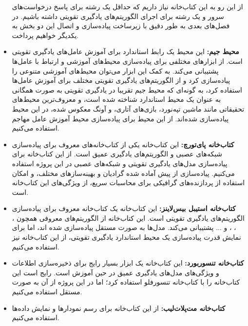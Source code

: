 \begin{itemize}
    از این رو به این کتاب‌خانه نیاز داریم که حداقل یک رشته برای پاسخ درخواست‌های سرور و یک رشته برای اجرای الگوریتم‌های یادگیری تقویتی داشته باشیم.
    در فصل‌های بعدی به طور دقیق با زیرساخت پیاده‌سازی و اتصال این دو بخش به یکدیگر خواهیم پرداخت.
    \item \textbf{محیط جیم:}
    این محیط یک رابط استاندارد برای آموزش عامل‌های یادگیری تقویتی است\cite{brockman2016openai}.
    از ابزار‌های مختلفی برای پیاده‌سازی محیط‌های آموزشی و ارتباط با عامل‌ها پشتیبانی می‌کند.
    به کمک این ابزار می‌توان محیط‌های آموزشی متنوعی را پیاده‌سازی کرد و از الگوریتم‌های یادگیری تقویتی مختلف برای آموزش عامل‌ها استفاده کرد، به گونه‌ای که محیط جیم تقریبا 
    در یادگیری تقویتی به صورت همگانی به عنوان یک محیط استاندارد شناخته شده است، و معروف‌ترین محیط‌های تحقیقاتی مانند
    ماشین تپه‌نورد\cite{Moore90efficientmemory-based}،
    بازی‌های آتاری،
    و آونگ معکوس شده،
    در این محیط پیاده‌سازی شده‌اند.
    از این محیط برای پیاده‌سازی محیط آموزش عامل مهاجم استفاده می‌کنیم.
    \item \textbf{کتاب‌خانه پای‌تورچ:}
    این کتاب‌خانه یکی از کتاب‌خانه‌های معروف برای پیاده‌سازی شبکه‌های عصبی و الگوریتم‌های یادگیری عمیق است.
    از این کتاب‌خانه برای پیاده‌سازی مدل‌های یادگیری تقویتی و شبکه‌های عصبی در این پروژه استفاده می‌کنیم.
    پیاده‌سازی از پیش آماده شده گرادیان و بهینه‌ساز‌های مختلف، و امکان استفاده از پردازنده‌های گرافیکی برای محاسبات سریع، از ویژگی‌های این کتاب‌خانه است\cite{paszke2019pytorch}.
    \item \textbf{کتاب‌خانه استیبل بیس‌لاینز:}
    این کتاب‌خانه یک کتاب‌خانه معروف برای پیاده‌سازی الگوریتم‌های یادگیری تقویتی است\cite{raffin2021stable}.
    این کتاب‌خانه از الگوریتم‌های معروفی همچون ، ، ، و ... پشتیبانی می‌کند.
    مدل‌ها به صورت مستقل پیاده‌سازی شده اند، اما برای نمایش قدرت پیاده‌سازی یک محیط استاندارد یادگیری تقویتی، از این کتاب‌خانه نیز استفاده می‌کنیم.
    \item \textbf{کتاب‌خانه تنسوربورد:}
    این کتاب‌خانه یک ابزار بسیار رایج برای ذخیره‌سازی اطلاعات و ویژگی‌های مدل‌های یادگیری عمیق در حین آموزش است.
    رایج است این کتاب‌خانه را با کتاب‌خانه تنسورفلو استفاده کرد؛ اما در این پرو‌ژه از آن به صورت مستقل استفاده می‌کنیم.
    \item \textbf{کتاب‌خانه مت‌پلات‌لیب:}
    از این کتاب‌خانه برای رسم نمودار‌ها و نمایش داده‌ها استفاده می‌کنیم.
    
\end{itemize}